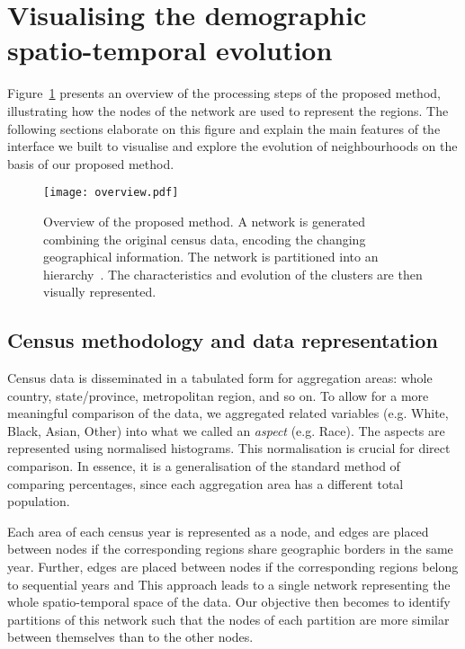 \section{Visualising the demographic spatio-temporal evolution}
\label{sec:method}
Figure~\ref{fig:overview} presents an overview of the processing steps of the
proposed method, illustrating how the nodes of the network are used to represent
the regions. The following sections elaborate on this figure and explain the
main features of the interface we built to visualise and explore the evolution
of neighbourhoods on the basis of our proposed method.


\begin{figure}
    \centering 
    \texttt{[image: overview.pdf]}
    \caption{Overview of the proposed method. A network is generated combining the
        original census data, encoding the changing geographical information.
        The network is partitioned into an hierarchy~\citep{markus2017}. The
        characteristics and evolution of the clusters are then visually
        represented.
        \label{fig:overview}}
\end{figure}


\subsection{Census methodology and data representation}

Census data is disseminated in a tabulated form for aggregation areas: whole
country, state/province, metropolitan region, and so on. To allow for a more
meaningful comparison of the data, we aggregated related variables (e.g. White,
Black, Asian, Other) into what we called an \emph{aspect} (e.g. Race). The
aspects are represented using normalised histograms. This normalisation is
crucial for direct comparison. In essence, it is a generalisation of the
standard method of comparing percentages, since each aggregation area has a
different total population.

Each area of each census year is represented as a node, and edges are placed
between nodes if the corresponding regions share geographic borders in the same
year. Further, edges are placed between nodes if the corresponding regions
belong to sequential years and  This approach
leads to a single network representing the whole spatio-temporal space of the
data. Our objective then becomes to identify partitions of this network such
that the nodes of each partition are more similar between themselves than to the
other nodes. 


